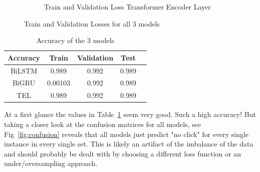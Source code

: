 \documentclass[utf8x]{ctexart}
\begin{document}
\begin{figure}[htb]
\begin{subfigure}[b]{0.48\textwidth}
    \caption{Train and Validation Loss Transformer Encoder Layer}
    \label{fig:TEL_trainlosses}
  \end{subfigure}
  \caption{Train and Validation Losses for all 3 models}
  \label{fig:losses1}
\end{figure}



\begin{table}[ht]
  \centering
  \caption{Accuracy of the 3 models}
  \label{tab:accuracy}
  \begin{tabular}{c|cccc}
    Accuracy & Train   & Validation & Test  \\
    \hline
    BiLSTM   & 0.989   & 0.992      & 0.989 \\
    BiGRU    & 0.00103 & 0.992      & 0.989 \\
    TEL      & 0.989   & 0.992      & 0.989 \\
  \end{tabular}
\end{table}


At a first glance the values in Table~\ref{tab:accuracy} seem very good. Such a high accuracy! But taking a closer look at the confusion matrices for all models, see Fig~\ref{fig:confusion} reveals that all models just predict "no click" for every single instance in every single set. This is likely an artifact of the imbalance of the data and should probably be dealt with by choosing a different loss function or an under/oversampling approach.
\end{document}
